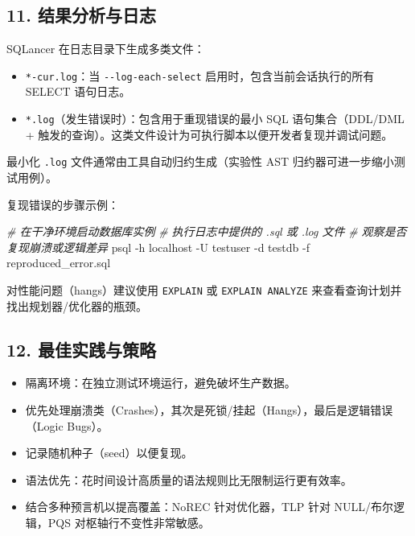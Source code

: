 \documentclass[
]{article}
\newenvironment{Shaded}{}{}
\newcommand{\AttributeTok}[1]{\textcolor[rgb]{0.49,0.56,0.16}{#1}}
\newcommand{\CommentTok}[1]{\textcolor[rgb]{0.38,0.63,0.69}{\textit{#1}}}
\newcommand{\ExtensionTok}[1]{#1}
\newcommand{\NormalTok}[1]{#1}
\providecommand{\tightlist}{%
  \setlength{\itemsep}{0pt}\setlength{\parskip}{0pt}}
\begin{document}
\subsection{11.
结果分析与日志}\label{ux7ed3ux679cux5206ux6790ux4e0eux65e5ux5fd7}

SQLancer 在日志目录下生成多类文件：

\begin{itemize}
\tightlist
\item
  \texttt{*-cur.log}：当 \texttt{-\/-log-each-select}
  启用时，包含当前会话执行的所有 SELECT 语句日志。\\
\item
  \texttt{*.log}（发生错误时）：包含用于重现错误的最小 SQL
  语句集合（DDL/DML +
  触发的查询）。这类文件设计为可执行脚本以便开发者复现并调试问题。
\end{itemize}

最小化 \texttt{.log} 文件通常由工具自动归约生成（实验性 AST
归约器可进一步缩小测试用例）。

复现错误的步骤示例：

\begin{Shaded}
\begin{Highlighting}[]
\CommentTok{\# 在干净环境启动数据库实例}
\CommentTok{\# 执行日志中提供的 .sql 或 .log 文件}
\CommentTok{\# 观察是否复现崩溃或逻辑差异}
\ExtensionTok{psql} \AttributeTok{{-}h}\NormalTok{ localhost }\AttributeTok{{-}U}\NormalTok{ testuser }\AttributeTok{{-}d}\NormalTok{ testdb }\AttributeTok{{-}f}\NormalTok{ reproduced\_error.sql}
\end{Highlighting}
\end{Shaded}

对性能问题（hangs）建议使用 \texttt{EXPLAIN} 或
\texttt{EXPLAIN\ ANALYZE} 来查看查询计划并找出规划器/优化器的瓶颈。

\subsection{12.
最佳实践与策略}\label{ux6700ux4f73ux5b9eux8df5ux4e0eux7b56ux7565}

\begin{itemize}
\tightlist
\item
  隔离环境：在独立测试环境运行，避免破坏生产数据。\\
\item
  优先处理崩溃类（Crashes），其次是死锁/挂起（Hangs），最后是逻辑错误（Logic
  Bugs）。\\
\item
  记录随机种子（seed）以便复现。\\
\item
  语法优先：花时间设计高质量的语法规则比无限制运行更有效率。\\
\item
  结合多种预言机以提高覆盖：NoREC 针对优化器，TLP 针对
  NULL/布尔逻辑，PQS 对枢轴行不变性非常敏感。
\end{itemize}
\end{document}
